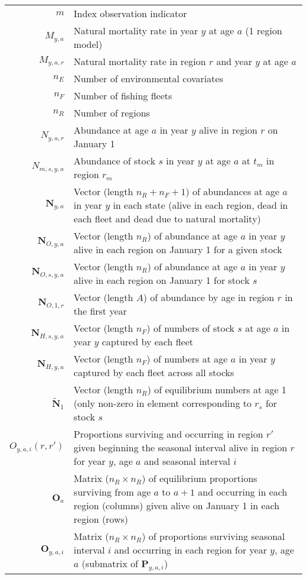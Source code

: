 \begin{longtable}[c]{r p{}}
$m$ & Index observation indicator\\
$M_{y,a}$ &  Natural mortality rate in year $y$ at age $a$ (1 region model)\\
$M_{y,a,r}$ & Natural mortality rate in region $r$ and year $y$ at age $a$\\
$n_E$ & Number of environmental covariates\\
$n_F$ & Number of fishing fleets\\
$n_R$ & Number of regions\\
$N_{y,a,r}$ & Abundance at age $a$ in year $y$ alive in region $r$ on January 1\\
$N_{m,s,y,a}$ & Abundance of stock $s$ in year $y$ at age $a$ at $t_m$ in region $r_m$\\
$\mathbf{N}_{y,a}$ & Vector (length $n_R + n_F + 1$) of abundances at age $a$ in year $y$ in each state (alive in each region, dead in each fleet and dead due to natural mortality)\\
$\mathbf{N}_{O,y,a}$ & Vector (length $n_R$) of abundance at age $a$ in year $y$ alive in each region on January 1 for a given stock\\
$\mathbf{N}_{O,s,y,a}$ & Vector (length $n_R$) of abundance at age $a$ in year $y$ alive in each region on January 1 for stock $s$\\
$\mathbf{N}_{O,1,r}$ & Vector (length $A$) of abundance by age in region $r$ in the first year\\
$\mathbf{N}_{H,s,y,a}$ & Vector (length $n_F$) of numbers of stock $s$ at age $a$ in year $y$ captured by each fleet\\
$\mathbf{N}_{H,y,a}$ & Vector (length $n_F$) of numbers at age $a$ in year $y$ captured by each fleet across all stocks\\
$\widetilde{\mathbf{N}}_{1}$ & Vector (length $n_R$) of equilibrium numbers at age 1 (only non-zero in element corresponding to $r_s$ for stock $s$\\
$O_{y,a,i}(r,r')$ & Proportions surviving and occurring in region $r'$ given beginning the seasonal interval alive in region $r$ for year $y$, age $a$ and seasonal interval $i$\\
$\mathbf{O}_{a}$ & Matrix ($n_R \times n_R$) of equilibrium proportions surviving from age $a$ to $a+1$ and occurring in each region (columns) given alive on January 1 in each region (rows)\\
$\mathbf{O}_{y,a,i}$ & Matrix ($n_R \times n_R$) of proportions surviving seasonal interval $i$ and occurring in each region for year $y$, age $a$ (submatrix of $\mathbf{P}_{y,a,i}$)\\

\end{longtable}
